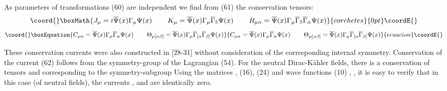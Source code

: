 \documentclass[a4paper,12pt]{article}
\begin{document}
As parameters of transformations (60) are independent we find from (61) the
conservation tensors:
\[\coord{}\boxMath{
J_\mu =i\overline{\Psi }(x)\Gamma _\mu \Psi (x)\hspace{0.3in}K_\mu
= \overline{\Psi }(x)\Gamma _\mu \overline{\Gamma }_5\Psi
(x)\hspace{0.3in} R_{\mu \alpha }=\overline{\Psi }(x)\Gamma _\mu
\overline{\Gamma }_5\overline{ \Gamma }_\alpha \Psi (x)
}{corchetes}{0pt}\coordE{}\]
\begin{equation}\coord{}\boxEquation{
C_{\mu \alpha }=\overline{\Psi }(x)\Gamma _\mu \overline{\Gamma
}_\alpha \Psi (x)\hspace{0.3in}\Theta _{\mu [\alpha \beta
]}=\overline{\Psi } (x)\Gamma _\mu \overline{\Gamma }_{[\alpha
}\overline{\Gamma }_{\beta ]}\Psi (x)  \label{62}
}{
C_{\mu \alpha }=\overline{\Psi }(x)\Gamma _\mu \overline{\Gamma
}_\alpha \Psi (x)\hspace{0.3in}\Theta _{\mu [\alpha \beta
]}=\overline{\Psi } (x)\Gamma _\mu \overline{\Gamma }_{[\alpha
}\overline{\Gamma }_{\beta ]}\Psi (x)  }{ecuacion}\coordE{}\end{equation}

These conservation currents were also constructed in [28-31] without
consideration of the corresponding internal symmetry. Conservation of the
current (62) follows from the symmetry-group \coordHE{} of the
Lagrangian (54). For the neutral Dirac-K\"ahler fields, there is a
conservation of tensors \coordHE{} and \myHighlight{$\Theta _{\mu [\alpha \beta ]}$}\coordHE{}
corresponding to the symmetry-subgroup \coordHE{} Using the matrices \myHighlight{$\Gamma
_\mu $}\coordHE{}, \myHighlight{$\overline{\Gamma }_\mu $}\coordHE{} (16), (24) and wave functions (10) \coordHE{}, \coordHE{}, it is
easy to verify that in this case (of neutral fields), the currents \coordHE{},
\coordHE{} and \coordHE{} are identically zero.
\end{document}
